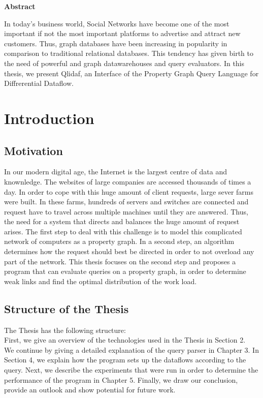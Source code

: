 \documentclass[11pt,singlecolumn]{scrartcl}
\begin{document}
\hspace{60mm}
\begin{center}
 \textbf{Abstract} \end{center}
In today's business world, Social Networks have become one of the most important if not the most important platforms to advertise and attract new customers. Thus, graph databases have been increasing in popularity in comparison to traditional relational databases. This tendency has given birth to the need of powerful and graph datawarehouses and query evaluators. In this thesis, we present Qlidaf, an Interface of the Property Graph Query Language for Diffrerential Dataflow.


\clearpage
\tableofcontents
\clearpage
\listoffigures
\clearpage
\section{Introduction}
\subsection{Motivation}
In our modern digital age, the Internet is the largest centre of data and knownledge. The websites of large companies are accessed thousands of times a day. In order to cope with this huge amount of client requests, large sever farms were built. In these farms, hundreds of servers and switches are connected and request have to travel across multiple machines until they are answered. Thus, the need for a system that directs and balances the huge amount of request arises. The first step to deal with this challenge is to model this complicated network of computers as a property graph. In a second step, an algorithm determines how the request should best be directed in order to not overload any part of the network. This thesis focuses on the second step and proposes a program that can evaluate queries on a property graph, in order to determine weak links and find the optimal distribution of the work load.
\subsection{Structure of the Thesis}
The Thesis has the following structure:\\
First, we give an overview of the technologies used in the Thesis in Section 2.\\
We continue by giving a detailed explanation of the query parser  in Chapter 3. In Section 4, we explain how the program sets up the dataflows according to the query. Next, we describe the experiments that were run in order to determine the performance of the program in Chapter 5. Finally, we draw our conclusion, provide an outlook and show potential for future work.
\clearpage
\end{document}
